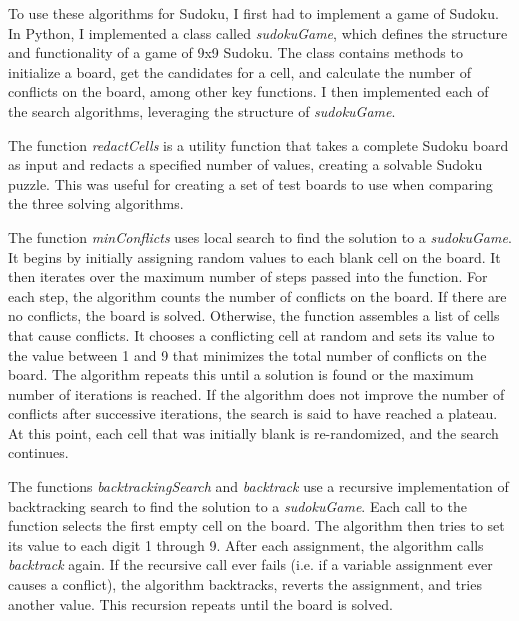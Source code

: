 \documentclass[12pt]{article}
\begin{document}
	To use these algorithms for Sudoku, I first had to implement a game of Sudoku. In Python, I implemented a class called \textit{sudokuGame}, which defines the structure and functionality of a game of 9x9 Sudoku. The class contains methods to initialize a board, get the candidates for a cell, and calculate the number of conflicts on the board, among other key functions. I then implemented each of the search algorithms, leveraging the structure of \textit{sudokuGame}.
	
	The function \textit{redactCells} is a utility function that takes a complete Sudoku board as input and redacts a specified number of values, creating a solvable Sudoku puzzle. This was useful for creating a set of test boards to use when comparing the three solving algorithms.
	
	The function \textit{\textit{minConflicts}} uses local search to find the solution to a \textit{sudokuGame}. It begins by initially assigning random values to each blank cell on the board. It then iterates over the maximum number of steps passed into the function. For each step, the algorithm counts the number of conflicts on the board. If there are no conflicts, the board is solved. Otherwise, the function assembles a list of cells that cause conflicts. It chooses a conflicting cell at random and sets its value to the value between 1 and 9 that minimizes the total number of conflicts on the board. The algorithm repeats this until a solution is found or the maximum number of iterations is reached. If the algorithm does not improve the number of conflicts after successive iterations, the search is said to have reached a plateau. At this point, each cell that was initially blank is re-randomized, and the search continues.
	
	The functions \textit{backtrackingSearch} and \textit{backtrack} use a recursive implementation of backtracking search to find the solution to a \textit{sudokuGame}. Each call to the function selects the first empty cell on the board. The algorithm then tries to set its value to each digit 1 through 9. After each assignment, the algorithm calls \textit{backtrack} again. If the recursive call ever fails (i.e. if a variable assignment ever causes a conflict), the algorithm backtracks, reverts the assignment, and tries another value. This recursion repeats until the board is solved.
	
\end{document}
